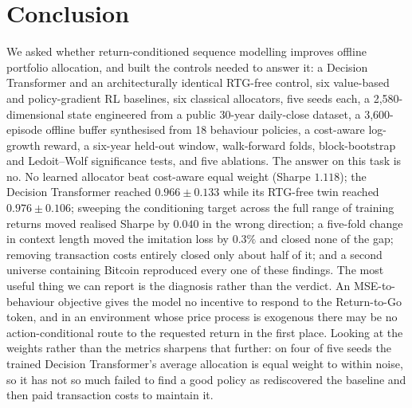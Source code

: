 \documentclass[11pt]{article}
\begin{document}
\section{Conclusion}

We asked whether return-conditioned sequence modelling improves offline portfolio allocation,
and built the controls needed to answer it: a Decision Transformer and an architecturally
identical RTG-free control, six value-based and policy-gradient RL baselines, six classical
allocators, five seeds each, a 2{,}580-dimensional state engineered from a public 30-year
daily-close dataset, a 3{,}600-episode offline buffer synthesised from 18 behaviour policies, a
cost-aware log-growth reward, a six-year held-out window, walk-forward folds, block-bootstrap
and Ledoit--Wolf significance tests, and five ablations. The answer on this task is no. No
learned allocator beat cost-aware equal weight (Sharpe $1.118$); the Decision Transformer
reached $0.966 \pm 0.133$ while its RTG-free twin reached $0.976 \pm 0.106$; sweeping the
conditioning target across the full range of training returns moved realised Sharpe by $0.040$
in the wrong direction; a five-fold change in context length moved the imitation loss by
$0.3\%$ and closed none of the gap; removing transaction costs entirely closed only about half
of it;
and a second universe containing Bitcoin reproduced every one of these findings. The most
useful thing we can report is the diagnosis rather than the verdict. An MSE-to-behaviour
objective gives the model no incentive to respond to the Return-to-Go token, and in an
environment whose price process is exogenous there may be no action-conditional route to the
requested return in the first place. Looking at the weights rather than the metrics sharpens
that further: on four of five seeds the trained Decision Transformer's average allocation is
equal weight to within noise, so it has not so much failed to find a good policy as
rediscovered the baseline and then paid transaction costs to maintain it.
\end{document}
